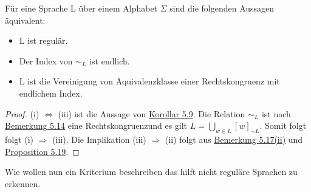   Für eine Sprache L über einem Alphabet \(\Sigma\) sind die folgenden Aussagen äquivalent:
  \begin{itemize}
    \item [(i)] L ist regulär.
    \item [(ii)] Der Index von \(\sim_{L}\) ist endlich.
    \item [(iii)] L ist die Vereinigung von Äquivalenzklasse einer Rechtskongruenz mit endlichem Index.
  \end{itemize}

  \begin{proof}
    (i) \(\Leftrightarrow\) (iii) ist die Aussage von \hyperref[subsec:5.9]{Korollar 5.9}. Die Relation \(\sim_L\) ist nach \hyperref[subsec:5.14]{Bemerkung 5.14} eine Rechtskongruenzund es gilt \(L = \bigcup \limits_{w \in L} [w]_{\sim L}\). Somit folgt folgt (i) \(\Rightarrow\) (iii). Die Implikation (iii) \(\Rightarrow\) (ii) folgt aus \hyperref[subsec:5.17]{Bemerkung 5.17(ii)} und \hyperref[subsec:5.19]{Proposition 5.19}.
  \end{proof}

  Wie wollen nun ein Kriterium beschreiben das hilft nicht reguläre Sprachen zu erkennen.

